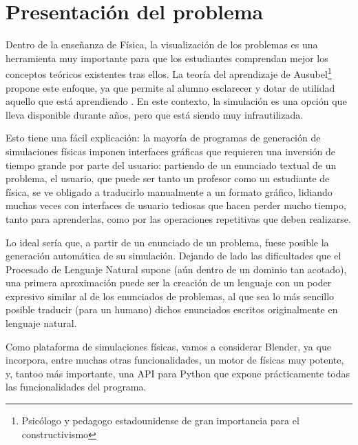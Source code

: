 \documentclass[12pt]{article}
\begin{document}

\tableofcontents
\pagebreak


\section{Presentación del problema}

Dentro de la enseñanza de Física, la visualización de los problemas es una herramienta muy importante para que los estudiantes comprendan mejor los conceptos teóricos existentes tras ellos. La teoría del aprendizaje de Ausubel\footnote{Psicólogo y pedagogo estadounidense de gran importancia para el constructivismo} propone este enfoque, ya que permite al alumno esclarecer y dotar de utilidad aquello que está aprendiendo \cite{ausubel1983teoria}. En este contexto, la simulación es una opción que lleva disponible durante años, pero que está siendo muy infrautilizada.

Esto tiene una fácil explicación: la mayoría de programas de generación de simulaciones físicas imponen interfaces gráficas que requieren una inversión de tiempo grande por parte del usuario: partiendo de un enunciado textual de un problema, el usuario, que puede ser tanto un profesor como un estudiante de física, se ve obligado a traducirlo manualmente a un formato gráfico, lidiando muchas veces con interfaces de usuario tediosas que hacen perder mucho tiempo, tanto para aprenderlas, como por las operaciones repetitivas que deben realizarse. 

Lo ideal sería que, a partir de un enunciado de un problema, fuese posible la generación automática de su simulación. Dejando de lado las dificultades que el Procesado de Lenguaje Natural supone (aún dentro de un dominio tan acotado), una primera aproximación puede ser la creación de un lenguaje con un poder expresivo similar al de los enunciados de problemas, al que sea lo más sencillo posible traducir (para un humano) dichos enunciados escritos originalmente en lenguaje natural.

Como plataforma de simulaciones físicas, vamos a considerar Blender, ya que incorpora, entre muchas otras funcionalidades, un motor de físicas muy potente, y, tantoo más importante, una API para Python que expone prácticamente todas las funcionalidades del programa.
\end{document}
